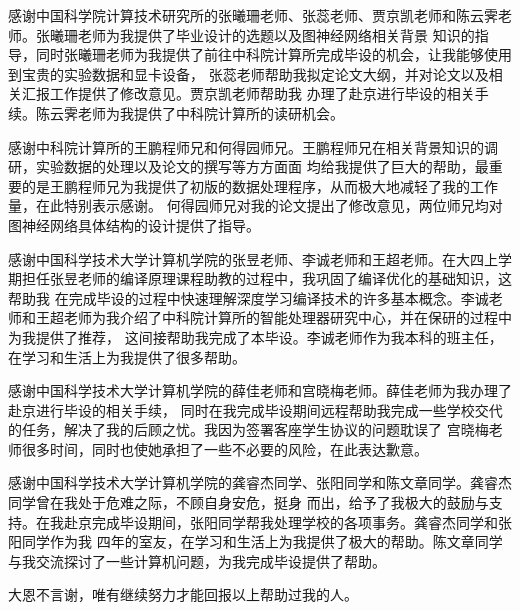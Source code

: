 
\begin{acknowledgements}

感谢中国科学院计算技术研究所的张曦珊老师、张蕊老师、贾京凯老师和陈云霁老师。张曦珊老师为我提供了毕业设计的选题以及图神经网络相关背景
知识的指导，同时张曦珊老师为我提供了前往中科院计算所完成毕设的机会，让我能够使用到宝贵的实验数据和显卡设备，
张蕊老师帮助我拟定论文大纲，并对论文以及相关汇报工作提供了修改意见。贾京凯老师帮助我
办理了赴京进行毕设的相关手续。陈云霁老师为我提供了中科院计算所的读研机会。

感谢中科院计算所的王鹏程师兄和何得园师兄。王鹏程师兄在相关背景知识的调研，实验数据的处理以及论文的撰写等方方面面
均给我提供了巨大的帮助，最重要的是王鹏程师兄为我提供了初版的数据处理程序，从而极大地减轻了我的工作量，在此特别表示感谢。
何得园师兄对我的论文提出了修改意见，两位师兄均对图神经网络具体结构的设计提供了指导。

感谢中国科学技术大学计算机学院的张昱老师、李诚老师和王超老师。在大四上学期担任张昱老师的编译原理课程助教的过程中，我巩固了编译优化的基础知识，这帮助我
在完成毕设的过程中快速理解深度学习编译技术的许多基本概念。李诚老师和王超老师为我介绍了中科院计算所的智能处理器研究中心，并在保研的过程中为我提供了推荐，
这间接帮助我完成了本毕设。李诚老师作为我本科的班主任，在学习和生活上为我提供了很多帮助。

感谢中国科学技术大学计算机学院的薛佳老师和宫晓梅老师。薛佳老师为我办理了赴京进行毕设的相关手续，
同时在我完成毕设期间远程帮助我完成一些学校交代的任务，解决了我的后顾之忧。我因为签署客座学生协议的问题耽误了
宫晓梅老师很多时间，同时也使她承担了一些不必要的风险，在此表达歉意。

感谢中国科学技术大学计算机学院的龚睿杰同学、张阳同学和陈文章同学。龚睿杰同学曾在我处于危难之际，不顾自身安危，挺身
而出，给予了我极大的鼓励与支持。在我赴京完成毕设期间，张阳同学帮我处理学校的各项事务。龚睿杰同学和张阳同学作为我
四年的室友，在学习和生活上为我提供了极大的帮助。陈文章同学与我交流探讨了一些计算机问题，为我完成毕设提供了帮助。

大恩不言谢，唯有继续努力才能回报以上帮助过我的人。

\end{acknowledgements}
